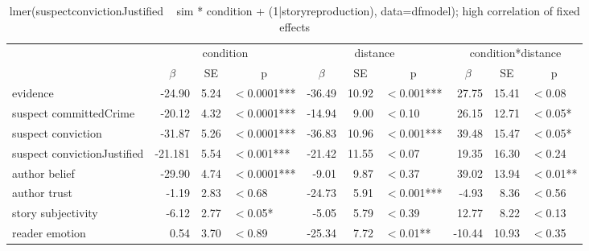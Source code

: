 \documentclass[10pt,letterpaper]{article}
\begin{document}
\begin{adjustwidth}{-1in}{-1in}
	\begin{table}
		\centering
		\begin{tabular}{l r r l r r l r r l}
			\toprule
			& \multicolumn{3}{c}{condition} & \multicolumn{3}{c}{distance} & \multicolumn{3}{c}{condition*distance} \\
			& \multicolumn{1}{c}{$\beta$} & \multicolumn{1}{c}{SE} & \multicolumn{1}{c}{p} & \multicolumn{1}{c}{$\beta$} & \multicolumn{1}{c}{SE} & \multicolumn{1}{c}{p} & \multicolumn{1}{c}{$\beta$} & \multicolumn{1}{c}{SE} & \multicolumn{1}{c}{p}\\
			\midrule
			evidence                              & -24.90 & 5.24 & $<$0.0001*** & -36.49 & 10.92 & $<$0.001*** & 27.75  & 15.41 & $<$0.08  \\
			suspect committedCrime    & -20.12  & 4.32 & $<$0.0001*** & -14.94 & 9.00 & $<$0.10          & 26.15  & 12.71 & $<$0.05*  \\
			suspect conviction              & -31.87 & 5.26  & $<$0.0001*** & -36.83 & 10.96 & $<$0.001***  & 39.48  & 15.47 & $<$0.05*  \\
			suspect convictionJustified & -21.181 & 5.54 & $<$0.001***  & -21.42 & 11.55 & $<$0.07        & 19.35  & 16.30 & $<$0.24    \\
			author belief                        & -29.90 & 4.74 & $<$0.0001***  & -9.01 & 9.87 & $<$0.37      & 39.02  & 13.94 & $<$0.01** \\
			author trust                          & -1.19   & 2.83 & $<$0.68             & -24.73 & 5.91 & $<$0.001*** & -4.93 & 8.36 & $<$0.56   \\
			story subjectivity                 & -6.12   & 2.77 & $<$0.05*          & -5.05 & 5.79 & $<$0.39         & 12.77   & 8.22 & $<$0.13  \\
			reader emotion                    & 0.54   & 3.70 & $<$0.89             & -25.34 & 7.72 & $<$0.01**     & -10.44  & 10.93 & $<$0.35  
		\end{tabular}
		\caption{lmer(suspectconvictionJustified ~ sim * condition + (1|storyreproduction), data=dfmodel); high correlation of fixed effects}
		\label{tab:distancemodel}
	\end{table}
\end{adjustwidth}

\cleardoublepage
\end{document}
